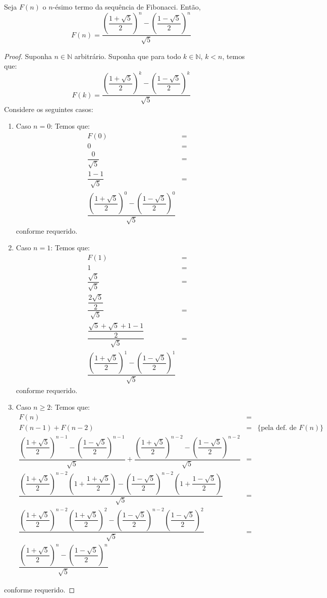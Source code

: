\begin{Theorem}
Seja $F(n)$ o $n$-ésimo termo da sequência de Fibonacci. Então,
\[
F(n) = \dfrac{\left(\dfrac{1 + \sqrt{5}}{2}\right)^n - \left(\dfrac{1 - \sqrt{5}}{2}\right)^n}{\sqrt{5}}
\]
\end{Theorem}
\begin{proof}
Suponha $n\in\mathbb{N}$ arbitrário. Suponha que para todo
$k\in\mathbb{N}$, $k < n$, temos que:
\[
F(k) = \dfrac{\left(\dfrac{1 + \sqrt{5}}{2}\right)^k - \left(\dfrac{1 - \sqrt{5}}{2}\right)^k}{\sqrt{5}}
\]
 Considere os seguintes casos:
\begin{enumerate}
  \item Caso $n = 0$: Temos que:
  \[
\begin{array}{lc}
    F(0) & =\\
    0     & = \\
    \dfrac{0}{\sqrt{5}} & = \\
    \dfrac{1 - 1}{\sqrt{5}} & = \\
    \dfrac{\left(\dfrac{1 + \sqrt{5}}{2}\right)^0 - \left(\dfrac{1 - \sqrt{5}}{2}\right)^0}{\sqrt{5}}
\end{array}
  \]
  conforme requerido.
  \item Caso $n = 1$: Temos que:
  \[
\begin{array}{lc}
    F(1) & =\\
    1     & = \\
    \dfrac{\sqrt{5}}{\sqrt{5}} & = \\
    \dfrac{\dfrac{2\sqrt{5}}{2}}{\sqrt{5}} & = \\
    \dfrac{\dfrac{\sqrt{5} + \sqrt{5} + 1 - 1}{2}}{\sqrt{5}} & = \\
    \dfrac{\left(\dfrac{1 + \sqrt{5}}{2}\right)^1 - \left(\dfrac{1 - \sqrt{5}}{2}\right)^1}{\sqrt{5}}
\end{array}
  \]
  conforme requerido.
  \item Caso $n\geq 2$: Temos que:
\[
\begin{array}{lcl}
F(n) & = \\
F(n - 1) + F(n - 2) & = & \{\text{pela def. de }F(n)\}\\
\dfrac{\left(\dfrac{1 + \sqrt{5}}{2}\right)^{n - 1} - \left(\dfrac{1 -
      \sqrt{5}}{2}\right)^{n - 1}}{\sqrt{5}} +
\dfrac{\left(\dfrac{1 + \sqrt{5}}{2}\right)^{n - 2} - \left(\dfrac{1 -
      \sqrt{5}}{2}\right)^{n - 2}}{\sqrt{5}} & = \\
\dfrac{\left(\dfrac{1 + \sqrt{5}}{2}\right)^{n - 2}\left(1 + \dfrac{1
      + \sqrt{5}}{2}\right) - \left(\dfrac{1 - \sqrt{5}}{2}\right)^{n - 2}\left(1 + \dfrac{1
      - \sqrt{5}}{2}\right)}{\sqrt{5}} & = \\
\dfrac{\left(\dfrac{1 + \sqrt{5}}{2}\right)^{n - 2}\left(\dfrac{1
      + \sqrt{5}}{2}\right)^2 - \left(\dfrac{1 - \sqrt{5}}{2}\right)^{n - 2}\left(\dfrac{1
      - \sqrt{5}}{2}\right)^2}{\sqrt{5}} & = \\
\dfrac{\left(\dfrac{1 + \sqrt{5}}{2}\right)^n - \left(\dfrac{1 - \sqrt{5}}{2}\right)^n}{\sqrt{5}}
\end{array}
\]
\end{enumerate}
conforme requerido.
\end{proof}

